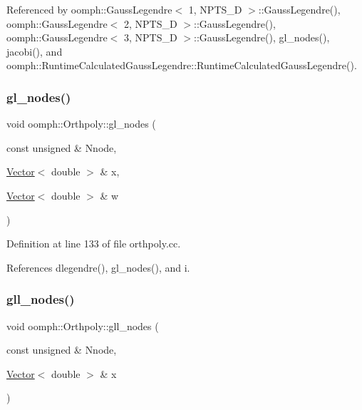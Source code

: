 Referenced by oomph\+::\+Gauss\+Legendre$<$ 1, N\+P\+T\+S\+\_\+D $>$\+::\+Gauss\+Legendre(), oomph\+::\+Gauss\+Legendre$<$ 2, N\+P\+T\+S\+\_\+D $>$\+::\+Gauss\+Legendre(), oomph\+::\+Gauss\+Legendre$<$ 3, N\+P\+T\+S\+\_\+D $>$\+::\+Gauss\+Legendre(), gl\+\_\+nodes(), jacobi(), and oomph\+::\+Runtime\+Calculated\+Gauss\+Legendre\+::\+Runtime\+Calculated\+Gauss\+Legendre().

\mbox{\label{namespaceoomph_1_1Orthpoly_a9b11a3992826d8daf747565d4cfcc819}} 
\subsubsection{\texorpdfstring{gl\+\_\+nodes()}{gl\_nodes()}\hspace{0.1cm}{\footnotesize\ttfamily [2/2]}}
{\footnotesize\ttfamily void oomph\+::\+Orthpoly\+::gl\+\_\+nodes (\begin{DoxyParamCaption}\item[{const unsigned \&}]{Nnode,  }\item[{\hyperlink{classoomph_1_1Vector}{Vector}$<$ double $>$ \&}]{x,  }\item[{\hyperlink{classoomph_1_1Vector}{Vector}$<$ double $>$ \&}]{w }\end{DoxyParamCaption})}



Definition at line 133 of file orthpoly.\+cc.



References dlegendre(), gl\+\_\+nodes(), and i.

\mbox{\label{namespaceoomph_1_1Orthpoly_ab6f86bfb7e2a8832560862c47fc60db5}} 
\subsubsection{\texorpdfstring{gll\+\_\+nodes()}{gll\_nodes()}\hspace{0.1cm}{\footnotesize\ttfamily [1/2]}}
{\footnotesize\ttfamily void oomph\+::\+Orthpoly\+::gll\+\_\+nodes (\begin{DoxyParamCaption}\item[{const unsigned \&}]{Nnode,  }\item[{\hyperlink{classoomph_1_1Vector}{Vector}$<$ double $>$ \&}]{x }\end{DoxyParamCaption})}



